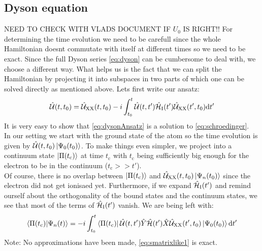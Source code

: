 \subsection{Dyson equation}
NEED TO CHECK WITH VLADS DOCUMENT IF $U_0$ IS RIGHT!!
For determining the time evolution we need to be carefull since the whole Hamiltonian doesnt commutate with itself at different times so we need to be exact. 
Since the full Dyson series \eqref{eq:dyson} can be cumbersome to deal with, we choose a different way. 
What helps us is the fact that we can split the Hamiltonian by projecting it into subspaces in two parts of which one can be solved directly as mentioned above. 
Lets first write our ansatz:
\begin{equation}
    \hat{\mathcal{U}}(t,t_0)=\hat{\mathcal{U}}_{\mathrm{XX}}(t,t_0)-i\int_{t_0}^{t} \hat{\mathcal{U}}(t,t')\hat{\mathcal{H}}_{\mathrm{I}}(t')\hat{\mathcal{U}}_{\mathrm{XX}}(t',t_0) \mathrm{d} t'       \label{eq:dysonAnsatz}
\end{equation}
It is very easy to show that \eqref{eq:dysonAnsatz} is a solution to \eqref{eq:schroedinger}.\\
In our setting we start with the ground state of the atom so the time evolution is given by $\hat{\mathcal{U}}(t,t_0)\ket{\Psi_0(t_0)}$.
To make things even simpler, we project into a continuum state $\ket{\Pi(t_{\mathrm{c}})}$ at time $t_{\mathrm{c}}$ with $t_{\mathrm{c}}$ being sufficiently big enough for the electron to be in the continuum ($t_{\mathrm{c}} >> t'$).\\
Of course, there is no overlap between $\ket{\Pi(t_{\mathrm{c}})}$ and $\hat{\mathcal{U}}_{\mathrm{XX}}(t,t_0)\ket{\Psi_n(t_0)}$ since the electron did not get ionisaed yet. 
Furthermore, if we expand $\hat{\mathcal{H}}_{\mathrm{I}}(t')$ and remind ourself about the orthogonality of the bound states and the continuum states, we see that most of the terms of $\hat{\mathcal{H}}_{\mathrm{I}}(t')$ vanish.
We are being left with:
\begin{equation}
    \braket{\Pi(t_{\mathrm{c}})|\Psi_n(t)} = -i \int_{t_0}^{t} \bra{\Pi(t_{\mathrm{c}})}\hat{\mathcal{U}}(t,t')\hat{Y}\hat{\mathcal{H}}(t')\hat{X}\hat{\mathcal{U}}_{\mathrm{XX}}(t',t_0)\ket{\Psi_0(t_0)} \mathrm{d} t' \label{eq:smatrixlike1}
\end{equation}
Note: No approximations have been made, \eqref{eq:smatrixlike1} is exact.




